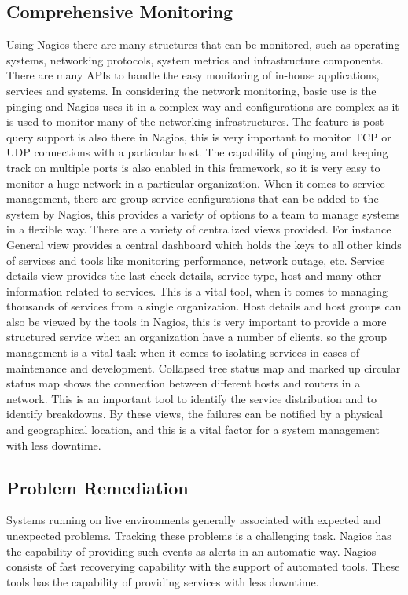 \documentclass[9pt,twocolumn,twoside]{styles/osajnl}
\begin{document}
\subsection{Comprehensive Monitoring}

Using Nagios there are many structures that can be monitored, such as
operating systems, networking protocols, system metrics and
infrastructure components. There are many APIs to handle the easy
monitoring of in-house applications, services and systems. In
considering the network monitoring, basic use is the pinging and
Nagios uses it in a complex way and configurations are complex as it
is used to monitor many of the networking infrastructures. The feature
is post query support is also there in Nagios, this is very important
to monitor TCP or UDP connections with a particular host. The
capability of pinging and keeping track on multiple ports is also
enabled in this framework, so it is very easy to monitor a huge
network in a particular organization. When it comes to service
management, there are group service configurations that can be added
to the system by Nagios, this provides a variety of options to a team
to manage systems in a flexible way. There are a variety of
centralized views provided. For instance General view provides a
central dashboard which holds the keys to all other kinds of services
and tools like monitoring performance, network outage, etc.  Service
details view provides the last check details, service type, host and
many other information related to services. This is a vital tool, when
it comes to managing thousands of services from a single
organization. Host details and host groups can also be viewed by the
tools in Nagios, this is very important to provide a more structured
service when an organization have a number of clients, so the group
management is a vital task when it comes to isolating services in
cases of maintenance and development. Collapsed tree status map and
marked up circular status map shows the connection between different
hosts and routers in a network. This is an important tool to identify
the service distribution and to identify breakdowns. By these views,
the failures can be notified by a physical and geographical location,
and this is a vital factor for a system management with less downtime.

\subsection{Problem Remediation}

Systems running on live environments generally associated with
expected and unexpected problems. Tracking these problems is a
challenging task.  Nagios has the capability of providing such events
as alerts in an automatic way.  Nagios consists of fast recoverying
capability with the support of automated tools. These tools has the
capability of providing services with less downtime. 
\end{document}

